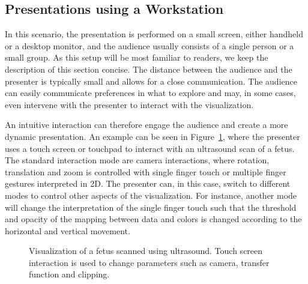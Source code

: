 \documentclass[review,journal]{vgtc}         %
\begin{document}
%
%
\subsection{Presentations using a Workstation} \label{sec:workstation}
In this scenario, the presentation is performed on a small screen, either handheld or a desktop monitor, and the audience usually consists of a single person or a small group.
As this setup will be most familiar to readers, we keep the description of this section concise.
The distance between the audience and the presenter is typically small and allows for a close communication.
The audience can easily communicate preferences in what to explore and may, in some cases, even intervene with the presenter to interact with the visualization.

An intuitive interaction can therefore engage the audience and create a more dynamic presentation.
An example can be seen in Figure~\ref{img:touch_workstation}, where the presenter uses a touch screen or touchpad to interact with an ultrasound scan of a fetus.
The standard interaction mode are camera interactions, where rotation, translation and zoom is controlled with single finger touch or multiple finger gestures interpreted in 2D.
The presenter can, in this case, switch to different modes to control other aspects of the visualization. For instance, another mode will change the interpretation of the single finger touch such that the threshold and opacity of the mapping between data and colors is changed according to the horizontal and vertical movement.

%
%
%
%

\begin{figure}
	\centering
	\caption{Visualization of a fetus scanned using ultrasound. Touch screen interaction is used to change parameters such as camera, transfer function and clipping.}
	\label{img:touch_workstation}
\end{figure}
\end{document}
